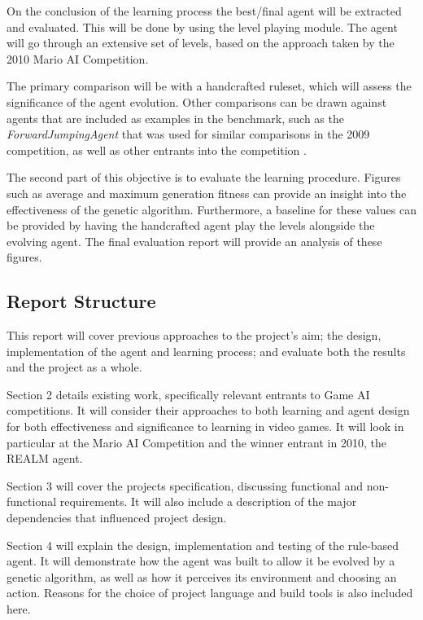 On the conclusion of the learning process the best/final agent will be extracted and evaluated. This will be done by using the level playing module. The agent will go through an extensive set of levels, based on the approach taken by the 2010 Mario AI Competition.

The primary comparison will be with a handcrafted ruleset, which will assess the significance of the agent evolution. Other comparisons can be drawn against agents that are included as examples in the benchmark, such as the \emph{ForwardJumpingAgent} that was used for similar comparisons in the 2009 competition, as well as other entrants into the competition \cite[p.~7]{2010the}.

The second part of this objective is to evaluate the learning procedure. Figures such as average and maximum generation fitness can provide an insight into the effectiveness of the genetic algorithm. Furthermore, a baseline for these values can be provided by having the handcrafted agent play the levels alongside the evolving agent. The final evaluation report will provide an analysis of these figures.

\subsection{Report Structure}

This report will cover previous approaches to the project's aim; the design, implementation of the agent and learning process; and evaluate both the results and the project as a whole.

Section 2 details existing work, specifically relevant entrants to Game AI competitions. It will consider their approaches to both learning and agent design for both effectiveness and significance to learning in video games. It will look in particular at the Mario AI Competition and the winner entrant in 2010, the REALM agent.

Section 3 will cover the projects specification, discussing functional and non-functional requirements. It will also include a description of the major dependencies that influenced project design.

Section 4 will explain the design, implementation and testing of the rule-based agent. It will demonstrate how the agent was built to allow it be evolved by a genetic algorithm, as well as how it perceives its environment and choosing an action. Reasons for the choice of project language and build tools is also included here. 


